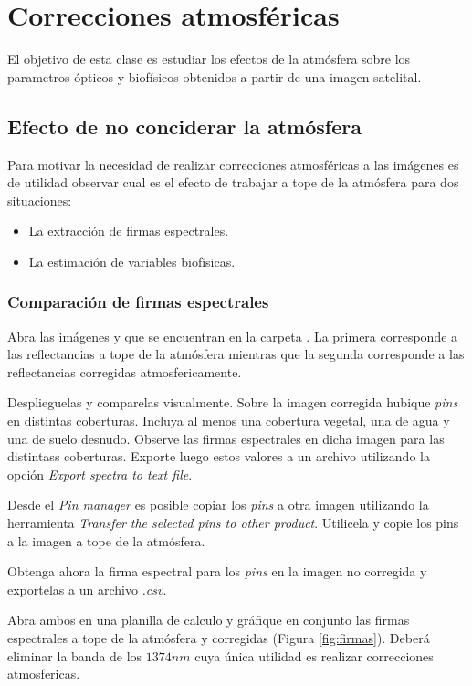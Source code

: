 
\chapter{Correcciones atmosféricas}
El objetivo de esta clase es estudiar los efectos de la atmósfera sobre los parametros ópticos y biofísicos obtenidos a partir de una imagen satelital.

\section{Efecto de no conciderar la atmósfera}

Para motivar la necesidad de realizar correcciones atmosféricas a las imágenes es de utilidad observar cual es el efecto de trabajar a tope de la atmósfera para dos situaciones:

\begin{itemize}
    \item La extracción de firmas espectrales.
    \item La estimación de variables biofísicas.
\end{itemize}

\subsection{Comparación de firmas espectrales}

Abra las imágenes  y  que se encuentran en la carpeta . La primera corresponde a las reflectancias a tope de la atmósfera mientras que la segunda corresponde a las reflectancias corregidas atmosfericamente.

Desplieguelas y comparelas visualmente. Sobre la imagen corregida hubique \emph{pins} en distintas coberturas. Incluya al menos una cobertura vegetal, una de agua y una de suelo desnudo. Observe las firmas espectrales en dicha imagen para las distintass coberturas. Exporte luego estos valores a un archivo  utilizando la opción \emph{Export spectra to text file}.

Desde el \emph{Pin manager} es posible copiar los \emph{pins} a otra imagen utilizando la herramienta \emph{Transfer the selected pins to other product}. Utilicela y copie los pins a la imagen a tope de la atmósfera.

Obtenga ahora la firma espectral para los \emph{pins} en la imagen no corregida y exportelas a un archivo \emph{.csv}.

Abra ambos en una planilla de calculo y gráfique en conjunto las firmas espectrales a tope de la atmósfera y corregidas (Figura \ref{fig:firmas}). Deberá eliminar la banda de los $1374nm$ cuya única utilidad es realizar correcciones atmosfericas.

